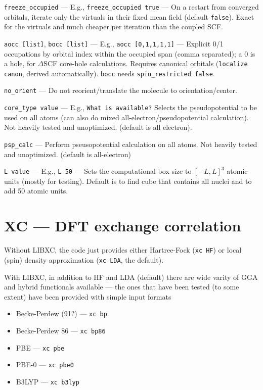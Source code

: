 \documentclass[letterpaper]{book}
\begin{document}
{\tt freeze\_occupied} --- E.g., {\tt freeze\_occupied true} --- On a restart from converged orbitals, iterate only the virtuals in their fixed mean field (default {\tt false}). Exact for the virtuals and much cheaper per iteration than the coupled SCF.

{\tt aocc [list]}, {\tt bocc [list]} --- E.g., {\tt aocc [0,1,1,1,1]} --- Explicit 0/1 occupations by orbital index within the occupied span (comma separated); a 0 is a hole, for $\Delta$SCF core-hole calculations. Requires canonical orbitals ({\tt localize canon}, derived automatically). {\tt bocc} needs {\tt spin\_restricted false}.

{\tt no\_orient} --- Do not reorient/translate the molecule to orientation/center.

{\tt core\_type value} --- E.g., {\tt What is available?} Selects the pseudopotential to be used on all atoms (can also do mixed all-electron/pseudopotential calculation).  Not heavily tested and unoptimized. (default is all electron).

{\tt psp\_calc} --- Perform pseusopotential calculation on all atoms.  Not heavily tested and unoptimized. (default is all-electron)

{\tt L value} --- E.g., {\tt L 50} --- Sets the computational box size to $[-L,L]^3$ atomic units (mostly for testing).  Default is to find cube that contains all nuclei and to add 50 atomic units.

\section{XC --- DFT exchange correlation}

Without LIBXC, the code just provides either Hartree-Fock ({\tt xc HF}) or local (spin) density approximation ({\tt xc LDA}, the default).

With LIBXC, in addition to HF and LDA (default) there are wide varity of GGA and hybrid functionals available --- the ones that have been tested (to some extent) have been provided with simple input formats
\begin{itemize}
\item Becke-Perdew (91?) --- \verb+xc bp+
\item Becke-Perdew 86 --- \verb+xc bp86+
\item PBE --- \verb+xc pbe+
\item PBE-0 --- \verb+xc pbe0+
\item B3LYP --- \verb+xc b3lyp+
\end{itemize}
\end{document}
